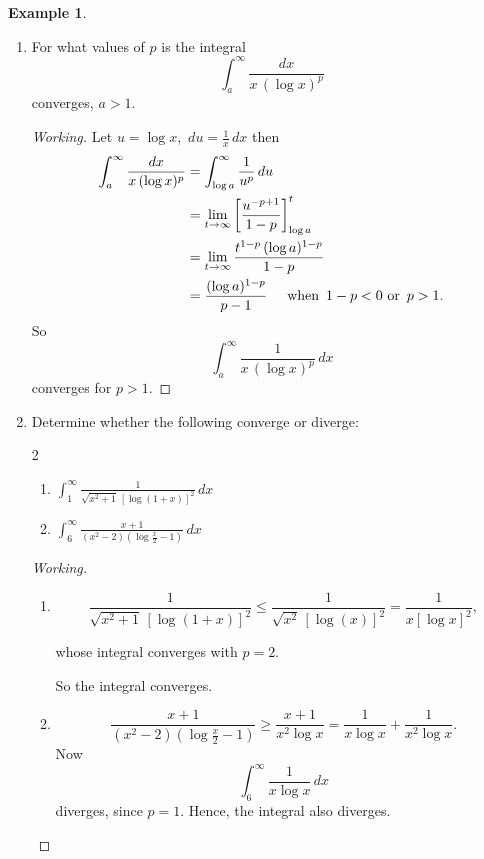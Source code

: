 \documentclass[12pt,a4paper]{report}
\theoremstyle{definition}
\newtheorem{exa}[thm]{Example}
\theoremstyle{plain}
\begin{document}
\begin{exa}\textbf{}
\vspace{-5mm}
\begin{enumerate}
\item[(a).] For what values of $p$ is the integral $$\int_a^{\infty}\frac{dx}{x\, (\log x)^p}$$ converges, $a > 1$.

\begin{proof}[Working]
Let $u = \log x$, $\, du = \frac{1}{x}\, dx$ then 
\begin{align*}
\int_a^{\infty} \frac{dx}{x\,(\log x)^p} & = \int^{\infty}_{\log a} \frac{1}{u^{p}}\, du\\
                                         & = \lim_{t\rightarrow \infty} \left[\frac{u^{-p + 1}}{1 - p}\right]^t_{\log a}\\
                                         & = \lim_{t\rightarrow \infty} \frac{t^{1 - p}\, (\log a)^{1-p}}{1 - p}\\
                                         & = \frac{(\log a)^{1-p}}{p - 1}\hspace{0.5cm} \text{when}\,\,\, 1 - p < 0 \,\, \text{or}\,\,\,p>1.
\end{align*}
So $$\int_a^{\infty} \frac{1}{x\, (\log x)^p}\, dx$$ converges for $p >1$.
\end{proof}



\item[(b).] Determine whether the following converge or diverge:
\begin{multicols}{2}
\begin{enumerate}
\item[(i).] $\displaystyle{\int_1^{\infty} \frac{1}{\sqrt{x^2 + 1}\, [\log(1 + x)]^2}}\, dx$
\item[(ii).] $\displaystyle{\int_6^{\infty} \frac{x + 1}{(x^2 - 2)\left(\log \frac{x}{2} - 1\right)}}\, dx$
\end{enumerate}
\end{multicols}

\begin{proof}[Working]\textbf{}
\begin{enumerate}
\item[(i).] $$ \frac{1}{\sqrt{x^2 + 1}\, [\log(1 + x)]^2} \leq \frac{1}{\sqrt{x^2}\, [\log(x)]^2} = \frac{1}{x[\log x]^2},$$

whose integral converges with $p=2$.

So the integral converges.


\item[(ii).] $$ \frac{x + 1}{(x^2 - 2)\left(\log\frac{x}{2} - 1\right)} \geq \frac{x + 1}{x^2 \log x} = \frac{1}{x\log x} + \frac{1}{x^2\log x}.$$
Now $$\int_6^{\infty} \frac{1}{x\log x}\, dx$$ diverges, since $p = 1$. Hence, the integral also diverges.
\end{enumerate}
\end{proof}
\end{enumerate}
\end{exa}
\end{document}
